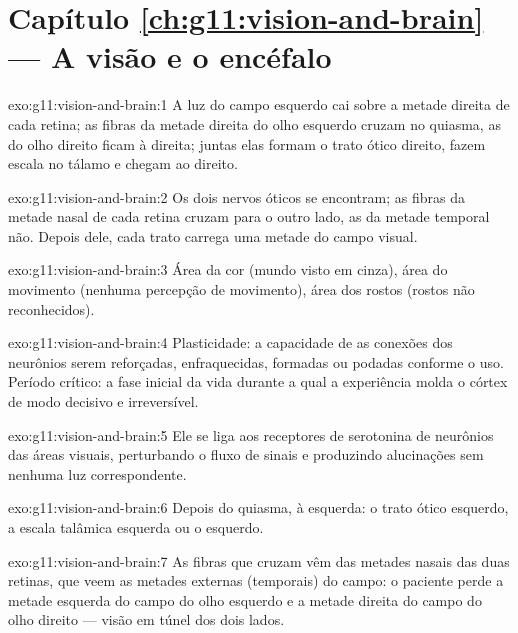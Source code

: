 \section*{Capítulo \ref{ch:g11:vision-and-brain} --- A visão e o encéfalo}

\begin{solution}{exo:g11:vision-and-brain:1}
A luz do campo esquerdo cai sobre a metade direita de cada retina; as
fibras da metade direita do olho esquerdo cruzam no quiasma, as do olho
direito ficam à direita; juntas elas formam o trato ótico direito,
fazem escala no tálamo e chegam ao  direito.
\end{solution}

\begin{solution}{exo:g11:vision-and-brain:2}
Os dois nervos óticos se encontram; as fibras da metade nasal de cada
retina cruzam para o outro lado, as da metade temporal não. Depois
dele, cada trato carrega uma metade do campo visual.
\end{solution}

\begin{solution}{exo:g11:vision-and-brain:3}
Área da cor (mundo visto em cinza), área do movimento (nenhuma
percepção de movimento), área dos rostos (rostos não reconhecidos).
\end{solution}

\begin{solution}{exo:g11:vision-and-brain:4}
Plasticidade: a capacidade de as conexões dos neurônios serem
reforçadas, enfraquecidas, formadas ou podadas conforme o uso. Período
crítico: a fase inicial da vida durante a qual a experiência molda o
córtex de modo decisivo e irreversível.
\end{solution}

\begin{solution}{exo:g11:vision-and-brain:5}
Ele se liga aos receptores de serotonina de neurônios das áreas
visuais, perturbando o fluxo de sinais e produzindo alucinações sem
nenhuma luz correspondente.
\end{solution}

\begin{solution}{exo:g11:vision-and-brain:6}
Depois do quiasma, à esquerda: o trato ótico esquerdo, a escala
talâmica esquerda ou o  esquerdo.
\end{solution}

\begin{solution}{exo:g11:vision-and-brain:7}
As fibras que cruzam vêm das metades nasais das duas retinas, que veem
as metades externas (temporais) do campo: o paciente perde a metade
esquerda do campo do olho esquerdo e a metade direita do campo do olho
direito --- visão em túnel dos dois lados.
\end{solution}

